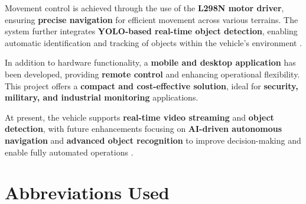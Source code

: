 \documentclass[12pt,a4paper]{report}
\begin{document}
Movement control is achieved through the use of the \textbf{L298N motor driver}, ensuring \textbf{precise navigation} for efficient movement across various terrains. The system further integrates \textbf{YOLO-based real-time object detection}, enabling automatic identification and tracking of objects within the vehicle’s environment \cite{yolov10}.

In addition to hardware functionality, a \textbf{mobile and desktop application} has been developed, providing \textbf{remote control} and enhancing operational flexibility. This project offers a \textbf{compact and cost-effective solution}, ideal for \textbf{security, military, and industrial monitoring} applications.

At present, the vehicle supports \textbf{real-time video streaming} and \textbf{object detection}, with future enhancements focusing on \textbf{AI-driven autonomous navigation} and \textbf{advanced object recognition} to improve decision-making and enable fully automated operations \cite{homl}.





\cleardoublepage



		\tableofcontents

			\chapter*{\centering Abbreviations Used }
		\label{Abbreviations Used}
		
		
\end{document}
